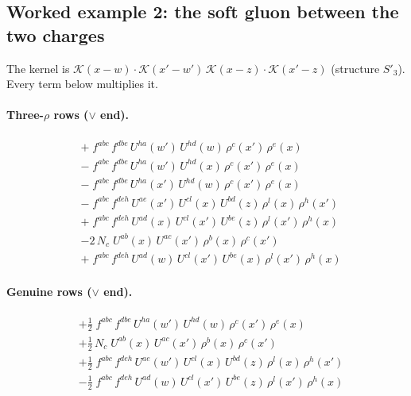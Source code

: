 \documentclass[10pt]{article}
\numberwithin{equation}{section}
\begin{document}
\subsection{Worked example 2: the soft gluon between the two charges}
The kernel is $\mathcal{K}(x-w)\cdot\mathcal{K}(x'-w')\,\mathcal{K}(x-z)\cdot\mathcal{K}(x'-z)$ (structure $S'_{3}$). Every term below multiplies it.
\paragraph{Three-$\rho$ rows ($\vee$ end).}
\begin{align*}
&+\;f^{abc}\,f^{dbe}\,U^{ha}(w')\,U^{hd}(w)\,\rho^{c}(x')\,\rho^{e}(x)\\&-\;f^{abc}\,f^{dbe}\,U^{ha}(w')\,U^{hd}(x)\,\rho^{c}(x')\,\rho^{e}(x)\\&-\;f^{abc}\,f^{dbe}\,U^{ha}(x')\,U^{hd}(w)\,\rho^{c}(x')\,\rho^{e}(x)\\&-\;f^{abc}\,f^{deh}\,U^{ae}(x')\,U^{cl}(x)\,U^{bd}(z)\,\rho^{l}(x)\,\rho^{h}(x')\\&+\;f^{abc}\,f^{deh}\,U^{ad}(x)\,U^{cl}(x')\,U^{be}(z)\,\rho^{l}(x')\,\rho^{h}(x)\\&-2\,N_c\;U^{ab}(x)\,U^{ac}(x')\,\rho^{b}(x)\,\rho^{c}(x')\\&+\;f^{abc}\,f^{deh}\,U^{ad}(w)\,U^{cl}(x')\,U^{be}(x)\,\rho^{l}(x')\,\rho^{h}(x)
\end{align*}
\paragraph{Genuine rows ($\vee$ end).}
\begin{align*}
&+\tfrac{1}{2}\;f^{abc}\,f^{dbe}\,U^{ha}(w')\,U^{hd}(w)\,\rho^{c}(x')\,\rho^{e}(x)\\&+\tfrac{1}{2}\,N_c\;U^{ab}(x)\,U^{ac}(x')\,\rho^{b}(x)\,\rho^{c}(x')\\&+\tfrac{1}{2}\;f^{abc}\,f^{deh}\,U^{ae}(w')\,U^{cl}(x)\,U^{bd}(z)\,\rho^{l}(x)\,\rho^{h}(x')\\&-\tfrac{1}{2}\;f^{abc}\,f^{deh}\,U^{ad}(w)\,U^{cl}(x')\,U^{be}(z)\,\rho^{l}(x')\,\rho^{h}(x)
\end{align*}
\end{document}
